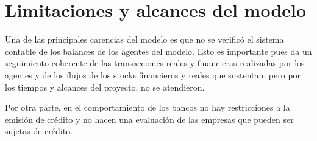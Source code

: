 \documentclass[12pt,a4paper]{article}
\begin{document}
\pagebreak
\section{Limitaciones y alcances del modelo}
Una de las principales carencias del modelo es que no se verificó el sistema contable de los balances de los agentes del modelo. Esto es importante pues da un seguimiento coherente de las transacciones reales y financieras realizadas por los agentes y de los flujos de los stocks financieros y reales que sustentan, pero por los tiempos y alcances del proyecto, no se atendieron.

Por otra parte, en el comportamiento de los bancos no hay restricciones a la emisión de crédito y no hacen una evaluación de las empresas que pueden ser sujetas de crédito.

\footnotesize

\end{document}
